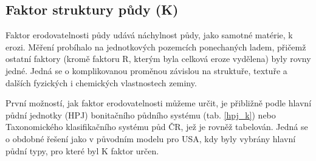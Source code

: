 \subsection{Faktor struktury půdy (K)}
Faktor erodovatelnosti půdy udává náchylnost půdy, jako samotné
matérie, k erozi. Měření probíhalo na jednotkových pozemcích
ponechaných ladem, přičemž ostatní faktory (kromě faktoru R, kterým
byla celková eroze vydělena) byly rovny jedné. Jedná se o
komplikovanou proměnou závislou na struktuře, textuře a dalších
fyzic\-kých i chemických vlastnostech zeminy.\cite{usle1978}

První možností, jak faktor erodovatelnosti můžeme určit, je přibližně
podle hlavní půdní jednotky (HPJ) bonitačního půdního systému
(tab. \ref{hpj_k}) nebo Taxonomického klasifikačního systému půd
ČR\cite{Nemecek2001}, jež je rovněž tabelován\cite{janecek2012}. Jedná
se o obdobné řešení jako v původním modelu pro USA, kdy byly vybrány
hlavní půdní typy, pro které byl K faktor určen.\cite{usle1978}

